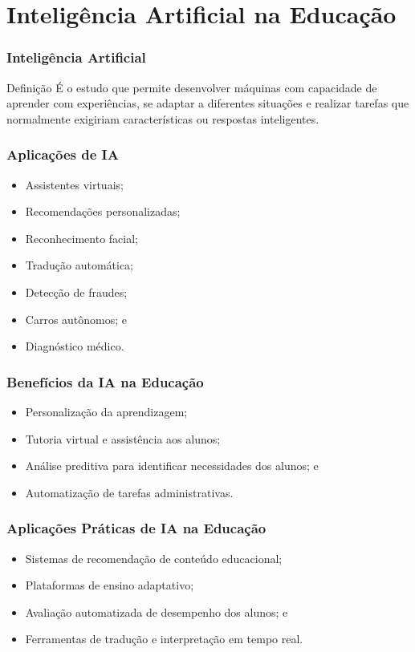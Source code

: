 \documentclass[aspectratio=169]{beamer} %
\begin{document}
\section{Inteligência Artificial na Educação}

\begin{frame}
	\frametitle{Inteligência Artificial}
	
	\begin{block}{Definição}
		É  o estudo que permite desenvolver máquinas com capacidade de  aprender com experiências, se adaptar a diferentes situações e realizar tarefas que normalmente exigiriam características ou respostas inteligentes.
	\end{block}
\end{frame}

\begin{frame}
	\frametitle{Aplicações de IA}
	
	\begin{itemize}
		\item Assistentes virtuais;
		\item Recomendações personalizadas;
		\item Reconhecimento facial;
		\item Tradução automática;
		\item Detecção de fraudes;
		\item Carros autônomos; e
		\item Diagnóstico médico.
	\end{itemize}
\end{frame}

\begin{frame}
	\frametitle{Benefícios da IA na Educação}
	
	\begin{itemize}
		\item Personalização da aprendizagem;
		\item Tutoria virtual e assistência aos alunos;
		\item Análise preditiva para identificar necessidades dos alunos; e
		\item Automatização de tarefas administrativas.
	\end{itemize}
\end{frame}

\begin{frame}
	\frametitle{Aplicações Práticas de IA na Educação}
	
	\begin{itemize}
		\item Sistemas de recomendação de conteúdo educacional;
		\item Plataformas de ensino adaptativo;
		\item Avaliação automatizada de desempenho dos alunos; e
		\item Ferramentas de tradução e interpretação em tempo real.
	\end{itemize}
\end{frame}
\end{document}

